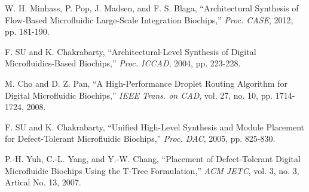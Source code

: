 \documentclass[journal]{IEEEtran}
\begin{document}
\begin{thebibliography}{99}
{
W. H. Minhass, P. Pop, J. Madsen, and F. S. Blaga, 
``Architectural Synthesis of Flow-Based Microfluidic Large-Scale Integration Biochips,''
{\em Proc. CASE}, 2012, pp. 181-190.


F. SU and K. Chakrabarty, 
``Architectural-Level Synthesis of Digital Microfluidics-Based Biochips,'' 
{\em Proc. ICCAD},
2004, pp. 223-228.


M. Cho and D. Z. Pan, 
``A High-Performance Droplet Routing Algorithm for Digital Microfluidic Biochips,'' 
{\em IEEE Trans. on CAD}, 
vol. 27, no. 10, pp. 1714-1724, 2008.


F. SU and K. Chakrabarty, 
``Unified High-Level Synthesis and Module Placement for Defect-Tolerant Microfluidic Biochips,'' 
{\em Proc. DAC},
2005, pp. 825-830.



P.-H. Yuh, C.-L. Yang, and Y.-W. Chang, 
``Placement of Defect-Tolerant Digital Microfluidic Biochips Using the T-Tree Formulation,''
{\em ACM JETC}, 
vol. 3, no. 3, Artical No. 13, 2007.

}
\end{thebibliography}
\end{document}
